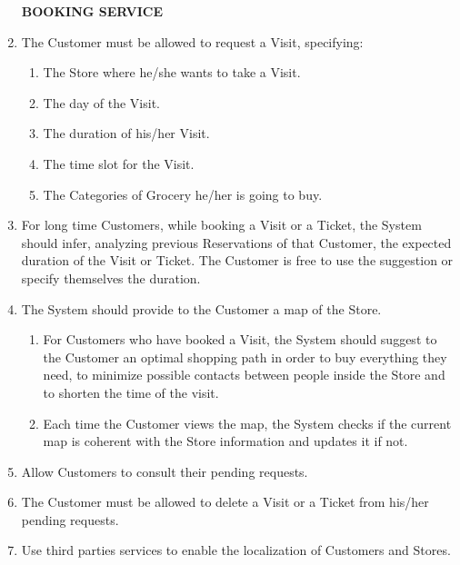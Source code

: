 \documentclass[a4paper, 12pt, oneside]{article}
\newcommand*{\lorenzo}[1]{\textcolor{BurntOrange}{#1}}
\newcommand{\yasmin}[1]{\textcolor{Red}{#1}}
\newcommand{\giovanni}[1]{\textcolor{Blue}{#1}}
\begin{document}
\begin{enumerate}[align=left, label={R.\arabic{*}}]
    \item[\textbf{BOOKING SERVICE}]
    \item \label{req:requestVisit}The Customer must be allowed to request a Visit, specifying:
    \begin{enumerate}[label={-}]
        \item \label{req:requestVisit:location}The Store where he/she wants to take a Visit.
        \item \label{req:requestVisit:date}The day of the Visit.
        \item \label{req:requestVisit:duration}The duration of his/her Visit.
        \item \label{req:requestVisit:timeslot}The time slot for the Visit.
        \item \label{req:requestVisit:categoriesToBuy}The Categories of Grocery he/her is going to buy.
    \end{enumerate}
    \item \label{req:statisticForDuration}For long time Customers, while booking a Visit or a Ticket, the System should infer, analyzing previous Reservations of that Customer, the expected duration of the Visit or Ticket. The Customer is free to use the suggestion or specify themselves the duration.
    \item \label{req:sysProvideMap}The System should provide to the Customer a map of the Store.
    \begin{enumerate}[label={-}]
        \item \label{req:sysProvideMap:suggestPath}For Customers who have booked a Visit, the System should suggest to the Customer an optimal shopping path in order to buy everything they need, to minimize possible contacts between people inside the Store and to shorten the time of the visit.
        \item \label{req:sysProvideMap:update} Each time the Customer views the map, the System checks if the current map is coherent with the Store information and updates it if not.
    \end{enumerate}
    \item \label{req:seeRequests}Allow Customers to consult their pending requests.
    \item \label{req:deleteTickOrVis}The Customer must be allowed to delete a Visit or a Ticket from his/her pending requests.
    \item \label{req:thirdPartyGPS}Use third parties services to enable the localization of Customers and Stores. 

\end{enumerate}
\end{document}
